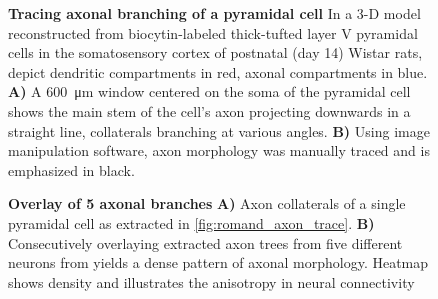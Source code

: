 






\vspace{0.5cm}
\begin{figure}[h] 
  \centering 

  \caption{\textbf{Tracing axonal branching of a pyramidal cell} 
    In a 3-D model reconstructed from biocytin-labeled thick-tufted
    layer V pyramidal cells in the somatosensory cortex of  postnatal
    (day 14) Wistar
    rats, \textcite{Romand2011} depict dendritic compartments in
    red, axonal compartments in blue. 
    \textbf{A)} A \SI{600}{\micro\meter} window centered on the
    soma of the pyramidal cell shows the main stem of the cell's axon projecting downwards in
    a straight line, collaterals branching at various angles. \textbf{B)} Using
    image manipulation software, axon morphology was manually traced
    and is emphasized in black.}%
    
  \label{fig:romand_axon_trace}
\end{figure}






\vspace{0.5cm}
\begin{figure}[h] 
  \centering 
    \caption{\textbf{Overlay of 5 axonal branches} \textbf{A)} Axon
      collaterals of a single pyramidal cell as extracted in
      \autoref{fig:romand_axon_trace}. \textbf{B)} Consecutively
      overlaying extracted axon trees from five different neurons from
    \textcite{Romand2011} yields a dense pattern of axonal
    morphology. Heatmap shows density and illustrates the anisotropy
    in neural connectivity}%
  \label{fig:axon_heat}
\end{figure}


